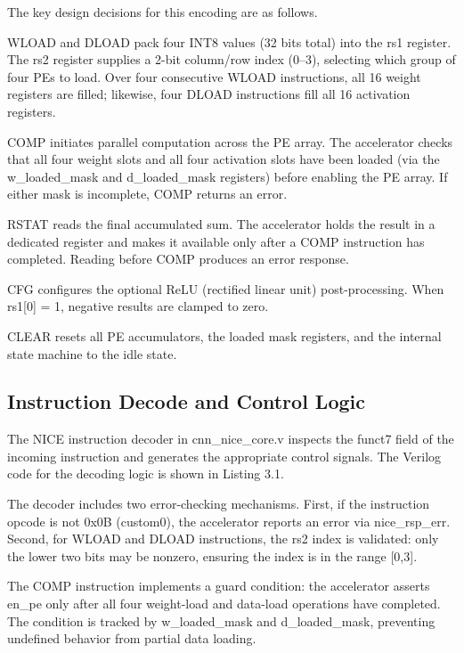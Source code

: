 The key design decisions for this encoding are as follows.

WLOAD and DLOAD pack four INT8 values (32 bits total) into the rs1 register. The rs2 register supplies a 2-bit column/row index (0–3), selecting which group of four PEs to load. Over four consecutive WLOAD instructions, all 16 weight registers are filled; likewise, four DLOAD instructions fill all 16 activation registers.

COMP initiates parallel computation across the PE array. The accelerator checks that all four weight slots and all four activation slots have been loaded (via the w\_loaded\_mask and d\_loaded\_mask registers) before enabling the PE array. If either mask is incomplete, COMP returns an error.

RSTAT reads the final accumulated sum. The accelerator holds the result in a dedicated register and makes it available only after a COMP instruction has completed. Reading before COMP produces an error response.

CFG configures the optional ReLU (rectified linear unit) post-processing. When rs1[0] = 1, negative results are clamped to zero.

CLEAR resets all PE accumulators, the loaded mask registers, and the internal state machine to the idle state.

\subsection{Instruction Decode and Control Logic}

The NICE instruction decoder in cnn\_nice\_core.v inspects the funct7 field of the incoming instruction and generates the appropriate control signals. The Verilog code for the decoding logic is shown in Listing 3.1.

The decoder includes two error-checking mechanisms. First, if the instruction opcode is not 0x0B (custom0), the accelerator reports an error via nice\_rsp\_err. Second, for WLOAD and DLOAD instructions, the rs2 index is validated: only the lower two bits may be nonzero, ensuring the index is in the range [0,3].

The COMP instruction implements a guard condition: the accelerator asserts en\_pe only after all four weight-load and data-load operations have completed. The condition is tracked by w\_loaded\_mask and d\_loaded\_mask, preventing undefined behavior from partial data loading.

